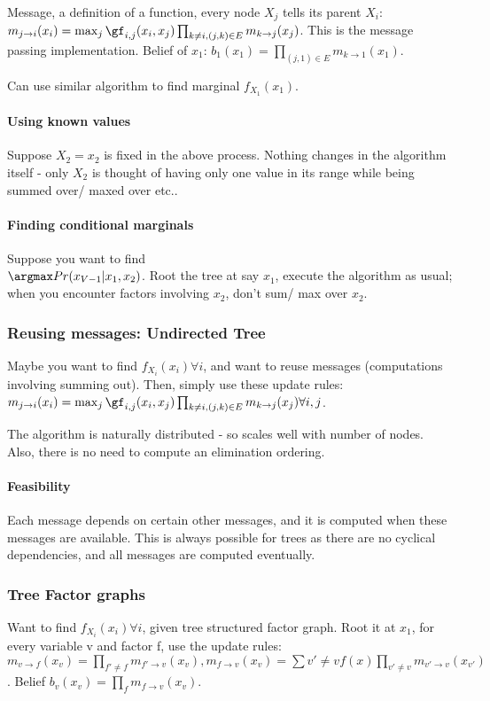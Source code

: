\documentclass[oneside, article]{memoir}
\begin{document}
Message, a definition of a function, every node $X_j$ tells its parent $X_i$: \\
$m_{j \to i}(x_i) = \max_j \gf_{i,j}(x_i, x_j) \prod_{k \neq i, (j,k) \in E} m_{k \to j}(x_j)$. This is the message passing implementation. Belief of $x_1$: $b_1(x_1) = \prod_{(j,1) \in E} m_{k \to 1}(x_1)$.

Can use similar algorithm to find marginal $f_{X_1}(x_1)$.

\paragraph*{Using known values}
Suppose $X_2 = x_2$ is fixed in the above process. Nothing changes in the algorithm itself - only $X_2$ is thought of having only one value in its range while being summed over/ maxed over etc..

\paragraph*{Finding conditional marginals}
Suppose you want to find \\
$\argmax Pr(x_{V-1}|x_1, x_2)$. Root the tree at say $x_1$, execute the algorithm as usual; when you encounter factors involving $x_2$, don't sum/ max over $x_2$.

\subsubsection{Reusing messages: Undirected Tree}
Maybe you want to find $f_{X_i}(x_i) \forall i$, and want to reuse messages (computations involving summing out). Then, simply use these update rules: $m_{j \to i}(x_i) = \max_j \gf_{i,j}(x_i, x_j) \prod_{k \neq i, (j,k) \in E} m_{k \to j}(x_j) \forall i, j$.

The algorithm is naturally distributed - so scales well with number of nodes. Also, there is no need to compute an elimination ordering.

\paragraph*{Feasibility}
Each message depends on certain other messages, and it is computed when these messages are available. This is always possible for trees as there are no cyclical dependencies, and all messages are computed eventually.

\subsubsection{Tree Factor graphs}
Want to find $f_{X_i}(x_i) \forall i$, given tree structured factor graph. Root it at $x_1$, for every variable v and factor f, use the update rules: \\
$m_{v \to f}(x_v) = \prod_{f' \neq f}m_{f' \to v}(x_v),  m_{f \to v}(x_v) = \sum{v' \neq v} f(x) \prod_{v' \neq v} m_{v' \to v}(x_{v'})$. Belief $b_v(x_v) = \prod_{f}m_{f \to v}(x_v)$.
\end{document}
